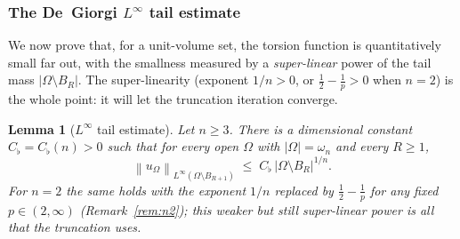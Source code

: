 \documentclass[11pt]{amsart}
\newtheorem{lemma}[theorem]{Lemma}
\theoremstyle{definition}
\newcommand{\Om}{\Omega}
\newcommand{\abs}[1]{\left|#1\right|}
\newcommand{\norm}[1]{\left\|#1\right\|}
\begin{document}
\subsubsection{The De~Giorgi \texorpdfstring{$L^\infty$}{L-infinity} tail estimate}\label{ssec:Linfty}

We now prove that, for a unit-volume set, the torsion function is
quantitatively small far out, with the smallness measured by a
\emph{super-linear} power of the tail mass $\abs{\Om\setminus B_R}$. The
super-linearity (exponent $1/n>0$, or $\tfrac12-\tfrac1p>0$ when $n=2$)
is the whole point: it will let the truncation iteration converge.

\begin{lemma}[$L^\infty$ tail estimate]\label{lem:Linfty}
Let $n\ge3$. There is a dimensional constant $C_\flat=C_\flat(n)>0$ such
that for every open $\Om$ with $\abs{\Om}=\omega_n$ and every $R\ge1$,
\begin{equation}\label{eq:Linfty}
   \norm{u_\Om}_{L^\infty(\Om\setminus B_{R+1})}
   \;\le\;C_\flat\,\abs{\Om\setminus B_R}^{1/n}.
\end{equation}
For $n=2$ the same holds with the exponent $1/n$ replaced by
$\tfrac12-\tfrac1p$ for any fixed $p\in(2,\infty)$
(Remark~\textup{\ref{rem:n2}}); this weaker but still super-linear power is
all that the truncation uses.
\end{lemma}
\end{document}
